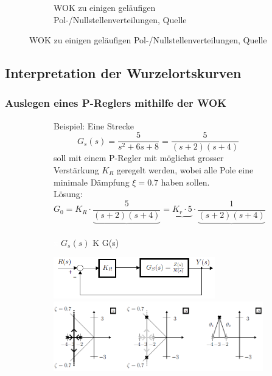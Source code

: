 \begin{enumerate}
\begin{figure}[h!]
\begin{center}
\begin{subfigure}[b]{10.5cm}
		\caption{WOK zu einigen geläufigen Pol-/Nullstellenverteilungen, Quelle}
	\end{subfigure}
	\end{center}
\end{figure}
\end{enumerate}

\subsection{Interpretation der Wurzelortskurven}

\subsubsection{Auslegen eines P-Reglers mithilfe der WOK}
\begin{figure}[h!]
	\begin{subfigure}[b]{8.5cm}
Beispiel: Eine Strecke \[G_s(s)=\frac{5}{s^2 + 6s +8}=\frac{5}{(s+2)(s+4)}\] soll mit einem P-Regler mit
 möglichst grosser Verstärkung $K_R$ geregelt werden, wobei alle Pole eine minimale
 Dämpfung $\xi = 0.7$ haben sollen.\\
Lösung: \[G_0=K_R\cdot\frac{5}{\underbrace{(s+2)(s+4)}}=\underbrace{K_r\cdot 5} \cdot\frac{1}{\underbrace{(s+2)(s+4)}}\]
\vspace{-0.5cm}\\
\textcolor{white}{x} \hspace{1.75cm} $G_s(s)$ \hspace{1.45cm} K  \hspace{1.1cm} G(s)\\

	\end{subfigure}\qquad
	\begin{subfigure}[b]{10cm}
		\includegraphics[width=7cm]{./images/PReglerBeispielWOK1.png}
		\includegraphics[width=10cm]{./images/PReglerBeispielWOK2.png}
	\end{subfigure}
\end{figure}

